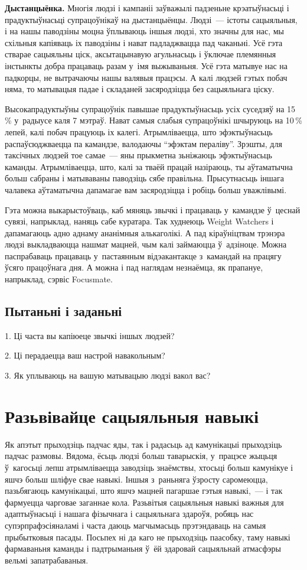 \textbf{Дыстанцыёнка.} Многія людзі і кампаніі заўважылі падзеньне крэатыўнасьці і прадуктыўнасьці супрацоўнікаў на дыстанцыёнцы. Людзі~--- істоты сацыяльныя, і на нашы паводзіны моцна ўплываюць іншыя людзі, хто значны для нас, мы схільныя капіяваць іх паводзіны і нават падладжвацца пад чаканьні. Усё гэта стварае сацыяльны ціск, аксытацынавую агульнасьць і ўключае племянныя інстынкты добра працаваць разам у~імя выжываньня. Усё гэта матывуе нас на падкорцы, не вытрачаючы нашы валявыя працэсы. А калі людзей гэтых побач няма, то матывацыя падае і складаней засяродзіцца без сацыяльнага ціску.

Высокапрадуктыўны супрацоўнік павышае прадуктыўнасьць усіх суседзяў на 15\,\% у~радыусе каля 7 мэтраў. Нават самыя слабыя супрацоўнікі шчыруюць на 10\,\% лепей, калі побач працуюць іх калегі. Атрымліваецца, што эфэктыўнасьць распаўсюджваецца па камандзе, валодаючы ``эфэктам пераліву''. Зрэшты, для таксічных людзей тое самае~--- яны прыкметна зьніжаюць эфэктыўнасьць каманды. Атрымліваецца, што, калі за тваёй працай назіраюць, ты аўтаматычна больш сабраны і матываваны паводзіць сябе правільна. Прысутнасьць іншага чалавека аўтаматычна дапамагае вам засяродзіцца і робіць больш уважлівымі.

Гэта можна выкарыстоўваць, каб мяняць звычкі і працаваць у~камандзе ў~цеснай сувязі, напрыклад, наняць сабе куратара. Так худнеюць Weight Watchers і дапамагаюць адно аднаму ананімныя алькаголікі. А пад кіраўніцтвам трэнэра людзі выкладваюцца нашмат мацней, чым калі займаюцца ў~адзіноце. Можна паспрабаваць працаваць у~пастаянным відэакантакце з~камандай на працягу ўсяго працоўнага дня. А можна і пад наглядам незнаёмца, як прапануе, напрыклад, сэрвіс Focusmate.

\subsection*{Пытаньні і заданьні}

1. Ці часта вы капіюеце звычкі іншых людзей?

2. Ці перадаецца ваш настрой навакольным?

3. Як уплываюць на вашую матывацыю людзі вакол вас?


\section{Разьвівайце сацыяльныя навыкі}

Як апэтыт прыходзіць падчас яды, так і радасьць ад камунікацыі прыходзіць падчас размовы. Вядома, ёсьць людзі больш таварыскія, у~працэсе жыцьця ў~кагосьці лепш атрымліваецца заводзіць знаёмствы, хтосьці больш камунікуе і яшчэ больш шліфуе свае навыкі. Іншыя з~раньняга ўзросту саромеюцца, пазьбягаюць камунікацыі, што яшчэ мацней пагаршае гэтыя навыкі,~--- і так фармуецца чарговае заганнае кола. Разьвітыя сацыяльныя навыкі важныя для адаптыўнасьці і нашага фізычнага і сацыяльнага здароўя, робяць нас супэрпрафэсіяналамі і часта даюць магчымасьць прэтэндаваць на самыя прыбытковыя пасады. Посьпех ні да каго не прыходзіць паасобку, таму навыкі фармаваньня каманды і падтрыманьня ў~ёй здаровай сацыяльнай атмасфэры вельмі запатрабаваныя.

